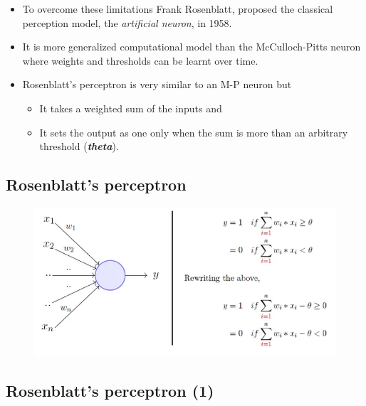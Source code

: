 \documentclass[
  letterpaper,
  DIV=11,
  numbers=noendperiod]{scrartcl}
\providecommand{\tightlist}{%
  \setlength{\itemsep}{0pt}\setlength{\parskip}{0pt}}\usepackage{longtable,booktabs,array}
\begin{document}
\begin{itemize}
\item
  To overcome these limitations Frank Rosenblatt, proposed the classical
  perception model, the \emph{artificial neuron}, in 1958.
\item
  It is more generalized computational model than the McCulloch-Pitts
  neuron where weights and thresholds can be learnt over time.
\item
  Rosenblatt's perceptron is very similar to an M-P neuron but

  \begin{itemize}
  \tightlist
  \item
    It takes a weighted sum of the inputs and
  \item
    It sets the output as one only when the sum is more than an
    arbitrary threshold (\textbf{\emph{theta}}).
  \end{itemize}
\end{itemize}

\hypertarget{rosenblatts-perceptron}{%
\subsection{Rosenblatt's perceptron}\label{rosenblatts-perceptron}}

\begin{figure}

{\centering 

\href{https://towardsdatascience.com/perceptron-the-artificial-neuron-4d8c70d5cc8d}{\includegraphics[width=1\textwidth,height=\textheight]{images/RosenblattPerceptron1.png}}

}

\end{figure}

\hypertarget{rosenblatts-perceptron-1}{%
\subsection{Rosenblatt's perceptron
(1)}\label{rosenblatts-perceptron-1}}
\end{document}

